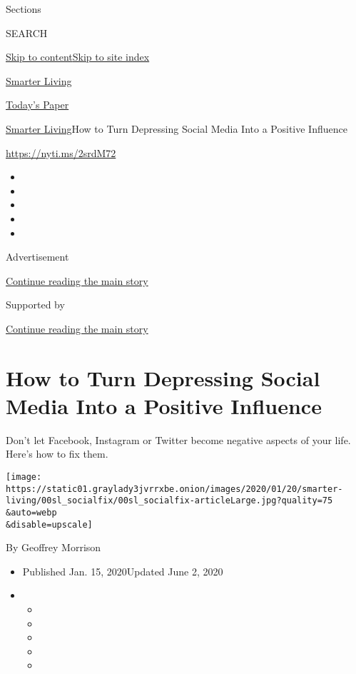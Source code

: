Sections

SEARCH

\protect\hyperlink{site-content}{Skip to
content}\protect\hyperlink{site-index}{Skip to site index}

\href{https://www.nytimes3xbfgragh.onion/section/smarter-living}{Smarter
Living}

\href{https://myaccount.nytimes3xbfgragh.onion/auth/login?response_type=cookie\&client_id=vi}{}

\href{https://www.nytimes3xbfgragh.onion/section/todayspaper}{Today's
Paper}

\href{/section/smarter-living}{Smarter Living}\textbar{}How to Turn
Depressing Social Media Into a Positive Influence

\url{https://nyti.ms/2srdM72}

\begin{itemize}
\item
\item
\item
\item
\item
\end{itemize}

Advertisement

\protect\hyperlink{after-top}{Continue reading the main story}

Supported by

\protect\hyperlink{after-sponsor}{Continue reading the main story}

\hypertarget{how-to-turn-depressing-social-media-into-a-positive-influence}{%
\section{How to Turn Depressing Social Media Into a Positive
Influence}\label{how-to-turn-depressing-social-media-into-a-positive-influence}}

Don't let Facebook, Instagram or Twitter become negative aspects of your
life. Here's how to fix them.

\texttt{[image: https://static01.graylady3jvrrxbe.onion/images/2020/01/20/smarter-living/00sl\_socialfix/00sl\_socialfix-articleLarge.jpg?quality=75\\\&auto=webp\\\&disable=upscale]}

By Geoffrey Morrison

\begin{itemize}
\item
  Published Jan. 15, 2020Updated June 2, 2020
\item
  \begin{itemize}
  \item
  \item
  \item
  \item
  \item
  \end{itemize}
\end{itemize}

